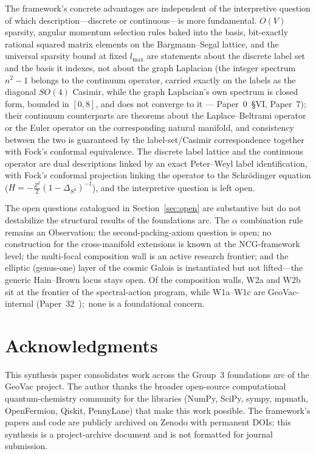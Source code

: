\documentclass[aps,pra,twocolumn,superscriptaddress,longbibliography]{revtex4-2}
\newcommand{\gvc}[2]{#2}
\begin{document}
The framework's concrete advantages are independent of the interpretive
question of which description---discrete or continuous---is more
fundamental.  $O(V)$ sparsity, angular momentum selection rules baked
into the basis, bit-exactly rational squared matrix elements on the
Bargmann--Segal lattice, and the universal sparsity bound at fixed
$l_{\max}$ are statements about the discrete label set and the basis it
indexes, not about the graph Laplacian (the integer spectrum $n^2 - 1$
belongs to the continuum operator, carried exactly on the labels as the
diagonal $SO(4)$ Casimir, while \gvc{graph-s3-wall}{the graph Laplacian's own spectrum is
closed form, bounded in $[0, 8]$, and does not converge to it ---
Paper~0~\S VI, Paper~7}); their continuum counterparts are theorems about
the Laplace--Beltrami operator or the Euler operator on the corresponding
natural manifold, and consistency between the two is guaranteed by the
label-set/Casimir correspondence together with Fock's conformal
equivalence.
The discrete label lattice and the continuous operator are dual
descriptions linked by an exact Peter--Weyl label identification, with
Fock's conformal projection linking the operator to the
Schr\"odinger equation ($H = -\tfrac{Z^2}{2}(1-\Delta_{S^3})^{-1}$), and the interpretive question is left open.

The open questions catalogued in Section~\ref{sec:open} are
substantive but do not destabilize the structural results of the
foundations arc.  \gvc{k-combination-rule}{The $\alpha$ combination rule remains an Observation};
the second-packing-axiom question is open; no construction for the
cross-manifold extensions is known at the NCG-framework level; the multi-focal composition
wall is an active research frontier; and the elliptic (genus-one) layer of the
cosmic Galois is instantiated but not lifted---the generic Hain--Brown locus
stays open.  Of the composition walls, W2a and W2b sit at the frontier
of the spectral-action program, while W1a--W1c are GeoVac-internal
(Paper~32~\cite{loutey_paper32});\ none is a foundational concern.

\section*{Acknowledgments}

This synthesis paper consolidates work across the Group~3 foundations
arc of the GeoVac project.  The author thanks the broader open-source
computational quantum-chemistry community for the libraries (NumPy,
SciPy, sympy, mpmath, OpenFermion, Qiskit, PennyLane) that make this
work possible.  The framework's papers and code are publicly archived
on Zenodo with permanent DOIs; this synthesis is a project-archive
document and is not formatted for journal submission.
\end{document}
